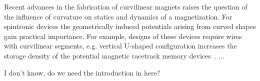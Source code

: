 \documentclass[runningheads,8pt]{llncs}
\begin{document}
%

Recent advances in the fabrication of curvilinear magnets \cite{Streubel16a,Fernandez17,Ball17,Sanz-Hernandez18,Huth18,Huth20,Sanz-Hernandez20} raises the question of the influence of curvature on statics and dynamics of a magnetization. For spintronic devices the geometrically induced potentials arising from curved shapes gain practical importance. For example, designs of these devices require wires with curvilinear segments, e.g. vertical U-shaped configuration increases the storage density of the potential magnetic racetrack memory devices~\cite{Parkin08,Zhang15}.
...

{\color{red} I don't know, do we need the introduction in here?} 









\end{document}
